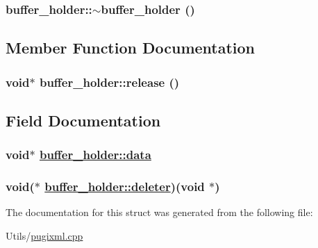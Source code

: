 \hypertarget{structbuffer__holder_43e10af0ca501bfa9bd1c2a012937876}{
\subsubsection[$\sim$buffer\_\-holder]{\setlength{\rightskip}{0pt plus 5cm}buffer\_\-holder::$\sim$buffer\_\-holder ()}}
\label{structbuffer__holder_43e10af0ca501bfa9bd1c2a012937876}




\subsection{Member Function Documentation}
\hypertarget{structbuffer__holder_dd9b75027bdf15dee0e2dc88225d5b10}{
\subsubsection[release]{\setlength{\rightskip}{0pt plus 5cm}void$\ast$ buffer\_\-holder::release ()}}
\label{structbuffer__holder_dd9b75027bdf15dee0e2dc88225d5b10}




\subsection{Field Documentation}
\hypertarget{structbuffer__holder_06c1e1004fac90848dfdb4fbc150cede}{
\subsubsection[data]{\setlength{\rightskip}{0pt plus 5cm}void$\ast$ \hyperlink{structbuffer__holder_06c1e1004fac90848dfdb4fbc150cede}{buffer\_\-holder::data}}}
\label{structbuffer__holder_06c1e1004fac90848dfdb4fbc150cede}


\hypertarget{structbuffer__holder_96e7067c68bc1f7a9ee7dd75c84f04e8}{
\subsubsection[deleter]{\setlength{\rightskip}{0pt plus 5cm}void($\ast$ \hyperlink{structbuffer__holder_96e7067c68bc1f7a9ee7dd75c84f04e8}{buffer\_\-holder::deleter})(void $\ast$)}}
\label{structbuffer__holder_96e7067c68bc1f7a9ee7dd75c84f04e8}




The documentation for this struct was generated from the following file:\begin{CompactItemize}
\item 
Utils/\hyperlink{pugixml_8cpp}{pugixml.cpp}\end{CompactItemize}
